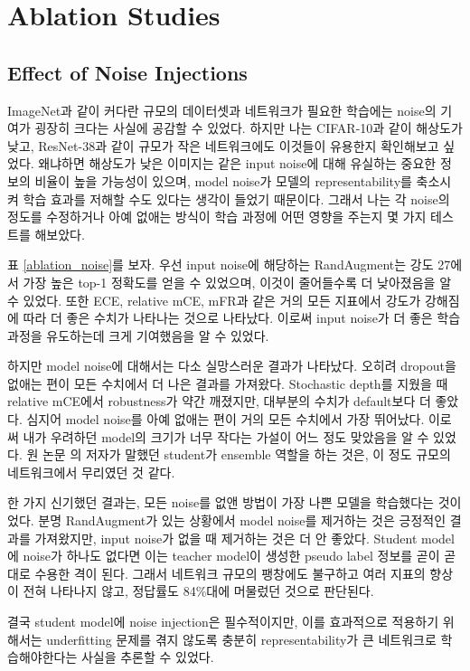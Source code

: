 \documentclass[a4paper, 10pt]{article}
\begin{document}
\section{Ablation Studies}
\subsection{Effect of Noise Injections}
ImageNet과 같이 커다란 규모의 데이터셋과 네트워크가 필요한 학습에는 noise의
기여가 굉장히 크다는 사실에 공감할 수 있었다. \cite{xie2020selftraining} 하지만
나는 CIFAR-10과 같이 해상도가 낮고, ResNet-38과 같이 규모가 작은 네트워크에도
이것들이 유용한지 확인해보고 싶었다. 왜냐하면 해상도가 낮은 이미지는 같은
input noise에 대해 유실하는 중요한 정보의 비율이 높을 가능성이 있으며, model
noise가 모델의 representability를 축소시켜 학습 효과를 저해할 수도 있다는 생각이
들었기 때문이다. 그래서 나는 각 noise의 정도를 수정하거나 아예 없애는 방식이
학습 과정에 어떤 영향을 주는지 몇 가지 테스트를 해보았다.

표 \ref{ablation_noise}를 보자. 우선 input noise에 해당하는 RandAugment는 강도
27에서 가장 높은 top-1 정확도를 얻을 수 있었으며, 이것이 줄어들수록 더
낮아졌음을 알 수 있었다. 또한 ECE, relative mCE, mFR과 같은 거의 모든 지표에서
강도가 강해짐에 따라 더 좋은 수치가 나타나는 것으로 나타났다. 이로써 input
noise가 더 좋은 학습 과정을 유도하는데 크게 기여했음을 알 수 있었다.

하지만 model noise에 대해서는 다소 실망스러운 결과가 나타났다. 오히려 dropout을
없애는 편이 모든 수치에서 더 나은 결과를 가져왔다. Stochastic depth를 지웠을
때 relative mCE에서 robustness가 약간 깨졌지만, 대부분의 수치가 default보다 더
좋았다. 심지어 model noise를 아예 없애는 편이 거의 모든 수치에서 가장 뛰어났다.
이로써 내가 우려하던 model의 크기가 너무 작다는 가설이 어느 정도 맞았음을 알 수
있었다. 원 논문 \cite{xie2020selftraining}의 저자가 말했던 student가 ensemble
역할을 하는 것은, 이 정도 규모의 네트워크에서 무리였던 것 같다.

한 가지 신기했던 결과는, 모든 noise를 없앤 방법이 가장 나쁜 모델을 학습했다는
것이었다. 분명 RandAugment가 있는 상황에서 model noise를 제거하는 것은 긍정적인
결과를 가져왔지만, input noise가 없을 때 제거하는 것은 더 안 좋았다. Student
model에 noise가 하나도 없다면 이는 teacher model이 생성한 pseudo label 정보를
곧이 곧대로 수용한 격이 된다. 그래서 네트워크 규모의 팽창에도 불구하고 여러
지표의 향상이 전혀 나타나지 않고, 정답률도 84\%대에 머물렀던 것으로 판단된다.

결국 student model에 noise injection은 필수적이지만, 이를 효과적으로 적용하기
위해서는 underfitting 문제를 겪지 않도록 충분히 representability가 큰 네트워크로
학습해야한다는 사실을 추론할 수 있었다.
\end{document}
